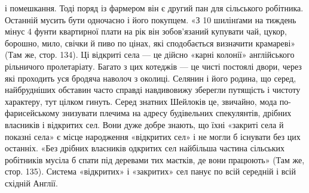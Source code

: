 і помешкання. Тоді поряд із фармером він є другий пан для сільського
робітника. Останній мусить бути одночасно і його покупцем. «З 10 шилінґами
на тиждень мінус 4 фунти квартирної плати на рік він зобов’язаний
купувати чай, цукор, борошно, мило, свічки й пиво по цінах,
які сподобається визначити крамареві» (Там же, стор. 134). Ці відкриті
села — це дійсно «карні колонії» англійського рільничого пролетаріату.
Багато з цих котеджів — це чисті постоялі двори, через які проходить
уся бродяча наволоч з околиці. Селянин і його родина, що серед,
найбрудніших обставин часто справді навдивовижу зберегли путящість
і чистоту характеру, тут цілком гинуть. Серед знатних Шейлоків це,
звичайно, мода по-фарисейському знизувати плечима на адресу будівельних
спекулянтів, дрібних власників і відкритих сел. Вони дуже
добре знають, що їхні «закриті села й показні села» є місце народження
«відкритих сел» і не могли б існувати без цих останніх. «Без дрібних
власників одкритих сел найбільша частина сільських робітників мусіла б
спати під деревами тих маєтків, де вони працюють» (Там же, стор. 135).
Система «відкритих» і «закритих» сел панує по всій середній і всій
східній Англії.
\parbreak{}  %
